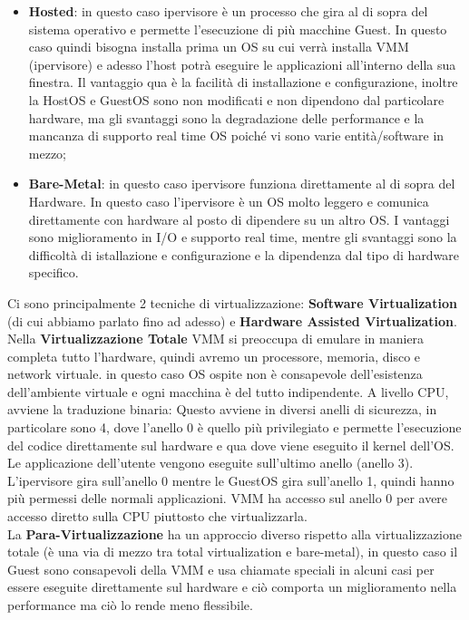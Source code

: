 \documentclass[11pt, twocolumn]{article}
\newenvironment{myitemize}
{ \begin{itemize}
		\setlength{\itemsep}{0pt}
		\setlength{\parskip}{0pt}
		\setlength{\parsep}{0pt}     }
	{ \end{itemize}                  }
\begin{document}
\begin{myitemize}
	\item \textbf{Hosted}: in questo caso ipervisore è un processo che gira al di sopra del sistema operativo e permette l'esecuzione di più macchine Guest.
	In questo caso quindi bisogna installa prima un OS su cui verrà installa VMM (ipervisore) e adesso l'host potrà eseguire le applicazioni all'interno della sua finestra.
	Il vantaggio qua è la facilità di installazione e configurazione, inoltre la HostOS e GuestOS sono non modificati e non dipendono dal particolare hardware, ma gli svantaggi sono la degradazione delle performance e la mancanza di supporto real time OS poiché vi sono varie entità/software in mezzo;
	\item \textbf{Bare-Metal}: in questo caso ipervisore funziona direttamente al di sopra del Hardware.
	In questo caso l'ipervisore è un OS molto leggero e comunica direttamente con hardware al posto di dipendere su un altro OS. 
	I vantaggi sono miglioramento in I/O e supporto real time, mentre gli svantaggi sono la difficoltà di istallazione e configurazione e la dipendenza dal tipo di hardware specifico.
\end{myitemize}
Ci sono principalmente 2 tecniche di virtualizzazione: \textbf{Software Virtualization} (di cui abbiamo parlato fino ad adesso) e \textbf{Hardware Assisted Virtualization}.\\
Nella \textbf{Virtualizzazione Totale} VMM si preoccupa di emulare in maniera completa tutto l'hardware, quindi avremo un processore, memoria, disco e network virtuale.
in questo caso OS ospite non è consapevole dell'esistenza dell'ambiente virtuale e ogni macchina è del tutto indipendente.
A livello CPU, avviene la traduzione binaria: Questo avviene in diversi anelli di sicurezza, in particolare sono 4, dove l'anello 0 è quello più privilegiato e permette l'esecuzione del codice direttamente sul hardware e qua dove viene eseguito il kernel dell'OS.
Le applicazione dell'utente vengono eseguite sull'ultimo anello (anello 3).\\
L'ipervisore gira sull'anello 0 mentre le GuestOS gira sull'anello 1, quindi hanno più permessi delle normali applicazioni. 
VMM ha accesso sul anello 0 per avere accesso diretto sulla CPU piuttosto che virtualizzarla. \\
La \textbf{Para-Virtualizzazione} ha un approccio diverso rispetto alla virtualizzazione totale (è una via di mezzo tra total virtualization e bare-metal), in questo caso il Guest sono consapevoli della VMM e usa chiamate speciali in alcuni casi per essere eseguite direttamente sul hardware e ciò comporta un miglioramento nella performance ma ciò lo rende meno flessibile.\\
\end{document}

